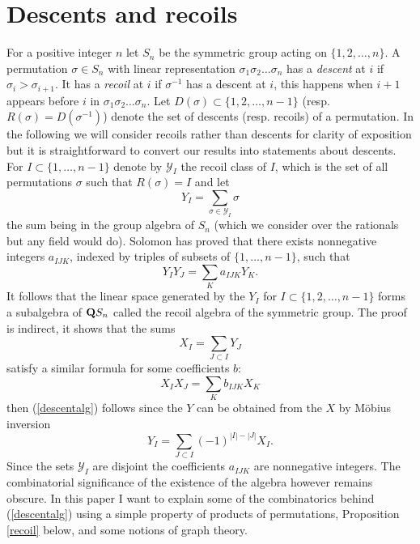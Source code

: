 \documentclass[11pt,a4paper]{amsart}
\theoremstyle{contraction}
\begin{document}
\section{Descents and recoils}
\label{sec:3}

For a positive integer $n$ let $S_n$ be the symmetric group acting on $\{1,2,\ldots,n\}$.
A permutation $\sigma\in S_n$ with  linear representation  $\sigma_1\sigma_2\ldots\sigma_n$ has a {\sl descent} at $i$ if $\sigma_i>\sigma_{i+1}$.
It has a {\sl recoil} at $i$ if $\sigma^{-1}$ has a descent at $i$, this happens when $i+1$ appears before $i$ in  $\sigma_1\sigma_2\ldots\sigma_n$.
Let $D(\sigma)\subset \{1,2,\ldots,n-1\}$ (resp. $R(\sigma)=D(\sigma^{-1})$) denote the set of descents (resp. recoils) of a permutation.
In the following we will consider recoils rather than descents for clarity of exposition but   it is straightforward to convert our results  into statements about descents. 
For $I\subset \{1,\ldots,n-1\}$ denote by ${\mathcal Y}_I$ the recoil class of $I$, which is the set of all permutations $\sigma$ such that $R(\sigma)=I$ and let
$$Y_I=\sum_{\sigma\in {\mathcal Y}_I}\sigma$$
the sum being in the group algebra of $S_n$ (which we consider over the rationals but any field would do).
Solomon \cite{S} has proved that there exists nonnegative integers $a_{IJK}$, indexed by triples of  subsets of $\{1,\ldots,n-1\}$, such that
\begin{equation}\label{descentalg}Y_IY_J=\sum_{K}a_{IJK}Y_K.\end {equation}
It follows that the linear space generated by the $Y_I$ for $I\subset\{1,2,\ldots,n-1\} $ forms a subalgebra of ${\bf Q}S_n$ called the recoil algebra of the symmetric group.
The proof is indirect, it shows that the sums $$X_I=\sum_{J\subset I}Y_J$$ satisfy a similar formula for some coefficients $b$:
 $$X_IX_J=\sum_{K}b_{IJK}X_K$$
 then (\ref{descentalg}) follows since the $Y$ can be obtained from the $X$ by M\"obius inversion
 $$Y_I=\sum_{J\subset I}(-1)^{|I|-|J|}X_I.$$
 Since the sets ${\mathcal Y}_I$ are disjoint the coefficients $a_{IJK}$ are nonnegative integers.
 The combinatorial significance of the existence of the algebra however remains obscure.
 In this paper I want to explain 
 some of the combinatorics behind (\ref{descentalg}) using a simple property of products of permutations, Proposition \ref{recoil} below, and some notions of  graph theory.
\end{document}
